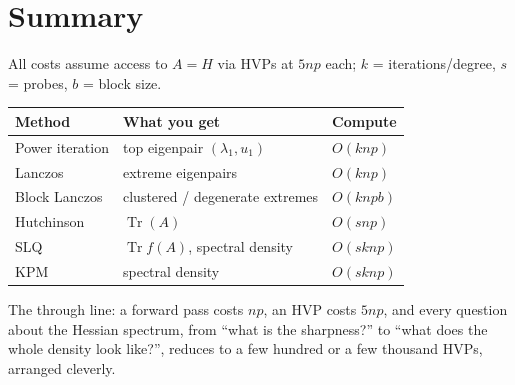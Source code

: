 \documentclass[11pt]{article}
\newcommand{\Tr}{\operatorname{Tr}}
\begin{document}
\section{Summary}

All costs assume access to $A = H$ via HVPs at $5np$ each; $k$ = iterations/degree, $s$ = probes, $b$ = block size.

\begin{center}
\begin{tabular}{lll}
\toprule
Method & What you get & Compute \\
\midrule
Power iteration & top eigenpair $(\lambda_1, u_1)$ & $O(knp)$ \\
Lanczos & extreme eigenpairs & $O(knp)$ \\
Block Lanczos & clustered / degenerate extremes & $O(knpb)$ \\
Hutchinson & $\Tr(A)$ & $O(snp)$ \\
SLQ & $\Tr f(A)$, spectral density & $O(sknp)$ \\
KPM & spectral density & $O(sknp)$ \\
\bottomrule
\end{tabular}
\end{center}

The through line: a forward pass costs $np$, an HVP costs $5np$, and every question about the Hessian spectrum, from ``what is the sharpness?'' to ``what does the whole density look like?'', reduces to a few hundred or a few thousand HVPs, arranged cleverly.
\end{document}
